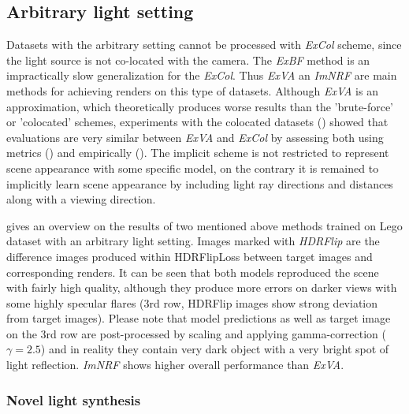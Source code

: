 \subsection{Arbitrary light setting}

Datasets with the arbitrary setting cannot be processed with \textit{ExCol} scheme,
since the light source is not co-located with the camera.
The \textit{ExBF} method is an impractically slow generalization for the \textit{ExCol}.
Thus \textit{ExVA} an \textit{ImNRF} are main methods for achieving renders on this type of datasets.
Although \textit{ExVA} is an approximation,
which theoretically produces worse results than the 'brute-force' or 'colocated' schemes,
experiments with the colocated datasets () showed
that evaluations are very similar between \textit{ExVA} and \textit{ExCol}
by assessing both using metrics () and empirically ().
The implicit scheme is not restricted to represent scene appearance with some specific model,
on the contrary it is remained to implicitly learn scene appearance
by including light ray directions and distances along with a viewing direction.

 gives an overview on the results of two mentioned above methods
trained on Lego dataset with an arbitrary light setting.
Images marked with \textit{HDRFlip} are the difference images produced within HDRFlipLoss \cite{andersson2020flip, theisel2021hdrflip}
between target images and corresponding renders.
It can be seen that both models reproduced the scene with fairly high quality,
although they produce more errors on darker views with some highly specular flares (3rd row, HDRFlip images show strong deviation from target images).
Please note that model predictions as well as target image on the 3rd row
are post-processed by scaling and applying gamma-correction ($\gamma = 2.5$)
and in reality they contain very dark object with a very bright spot of light reflection.
\textit{ImNRF} shows higher overall performance than \textit{ExVA}.


\subsubsection{Novel light synthesis}

